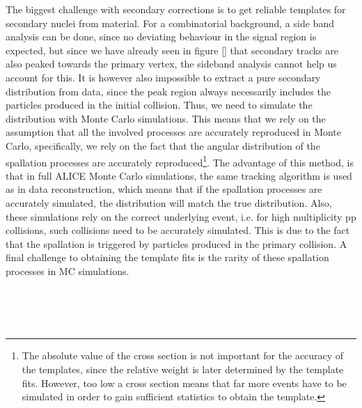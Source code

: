 The biggest challenge with secondary corrections is to get reliable templates for secondary nuclei from material. For a combinatorial background, a side band analysis can be done, since no deviating behaviour in the signal region is expected, but since we have already seen in figure \ref{} that secondary tracks are also peaked towards the primary vertex, the sideband analysis cannot help us account for this. It is however also impossible to extract a pure secondary distribution from data, since the peak region always necessarily includes the particles produced in the initial collision. Thus, we need to simulate the distribution with Monte Carlo simulations. This means that we rely on the assumption that all the involved processes are accurately reproduced in Monte Carlo, specifically, we rely on the fact that the angular distribution of the spallation processes are accurately reproduced\footnote{The absolute value of the cross section is not important for the accuracy of the templates, since the relative weight is later determined by the template fits. However, too low a cross section means that far more events have to be simulated in order to gain sufficient statistics to obtain the template.}. The advantage of this method, is that in full ALICE Monte Carlo simulations, the same tracking algorithm is used as in data reconstruction, which means that if the spallation processes are accurately simulated, the distribution will match the true distribution. Also, these simulations rely on the correct underlying event, i.e. for high multiplicity pp collisions, such collisions need to be accurately simulated. This is due to the fact that the spallation is triggered by particles produced in the primary collision. A final challenge to obtaining the template fits is the rarity of these spallation processes in MC simulations. 


\\ \\ \\ 


